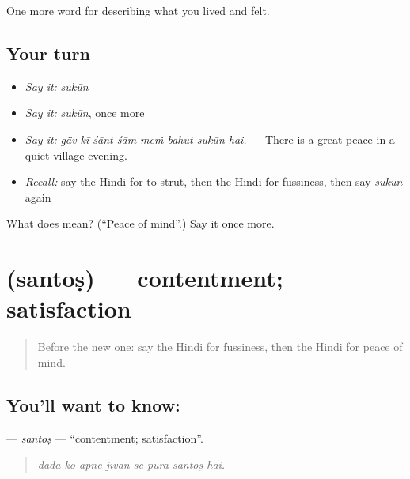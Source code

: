 \begin{grammarlens}[title={What you've built}]
One more word for describing what you lived and felt.
\end{grammarlens}

\subsection*{Your turn}
\begin{itemize}
\raggedright
  \item \emph{Say it:} \emph{sukūn}
  \item \emph{Say it:} \emph{sukūn}, once more
  \item \emph{Say it:} \emph{gā̃v kī śānt śām meṁ bahut sukūn hai.} — There is a great peace in a quiet village evening.
  \item \emph{Recall:} say the Hindi for to strut, then the Hindi for fussiness, then say \emph{sukūn} again
\end{itemize}

\begin{tcolorbox}[breakable,colback=teal!4,colframe=teal!35!black,title={Before you move on}]
What does  mean? (\textquotedblleft{}Peace of mind\textquotedblright{}.) Say it once more.
\end{tcolorbox}
\section[\texorpdfstring{\hi{संतोष} (santoṣ)}{संतोष (santoṣ)}]{ (santoṣ) — contentment; satisfaction}

\label{lesson:HI-C463-santos}



\begin{quote}
Before the new one: say the Hindi for fussiness, then the Hindi for peace of mind.
\end{quote}

\subsection*{You'll want to know: }
\textbf{} — \emph{santoṣ} — \textquotedblleft{}contentment; satisfaction\textquotedblright{}.

\begin{quote}
       
\end{quote}

\begin{quote}
\emph{dādā ko apne jīvan se pūrā santoṣ hai.}
\end{quote}

